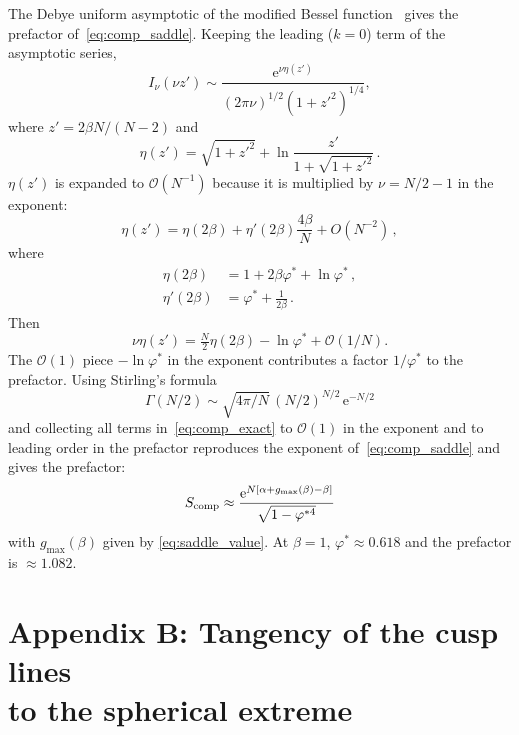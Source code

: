 \documentclass[letterpaper]{article} %
\newcommand{\e}{{\mathrm{e}}}
\newcommand{\Bnet}{\beta}
\begin{document}
The Debye uniform asymptotic of the modified Bessel function~\citep[10.41.3]{olver2010nist}
gives the prefactor of~\eqref{eq:comp_saddle}. Keeping the leading ($k = 0$) term of
the asymptotic series,
\begin{equation}
I_\nu(\nu z') \sim \frac{\e^{\nu\eta(z')}}{(2\pi\nu)^{1/2}(1+{z'}^2)^{1/4}},
\end{equation}
where $z' = 2\Bnet N/(N-2)$ and
\begin{equation}
    \eta(z') = \sqrt{1+{z'}^2} + \ln\frac{z'}{1+\sqrt{1+{z'}^2}}\,.
    \label{eq:bessel_debye}
\end{equation}  
$\eta(z')$ is expanded to $\mathcal{O}(N^{-1})$ because it is multiplied by
$\nu = N/2 - 1$ in the exponent:
\begin{equation}
    \eta(z') = \eta(2\Bnet) + \eta'(2\Bnet) \frac{4\Bnet}{N} + O(N^{-2})\,,
\end{equation}
where
\begin{align}
    \eta(2\Bnet)  &= 1 + 2\Bnet\varphi^* + \ln\varphi^*\,, \\
    \eta'(2\Bnet) &= \varphi^* + \frac{1}{2\Bnet}\,.
\end{align}
Then 
\begin{equation}
    \nu \eta(z') = \tfrac{N}{2} \eta(2\Bnet) - \ln\varphi^* + \mathcal{O}(1/N).
\end{equation}
The $\mathcal{O}(1)$ piece $-\ln\varphi^*$ in the exponent contributes a factor
$1/\varphi^*$ to the prefactor. Using Stirling's formula
\begin{equation}
    \Gamma(N/2) \sim \sqrt{4\pi/N}\,(N/2)^{N/2}\,\e^{-N/2}
\end{equation} 
and collecting all terms in~\eqref{eq:comp_exact} to $\mathcal{O}(1)$ in the
exponent and to leading order in the prefactor reproduces the exponent
of~\eqref{eq:comp_saddle} and gives the prefactor:
\begin{equation}
S_{\rm comp} \approx \frac{\e^{N[\alpha + g_{\max}(\Bnet) - \Bnet]}}{\sqrt{1-\varphi^{*4}}}
\label{eq:comp_laplace}
\end{equation}
with $g_{\max}(\Bnet)$ given by \eqref{eq:saddle_value}.
At $\Bnet = 1$, $\varphi^* \approx 0.618$ and the prefactor is $\approx 1.082$.


\section{Appendix B: Tangency of the cusp lines \\to the spherical extreme}
\end{document}
